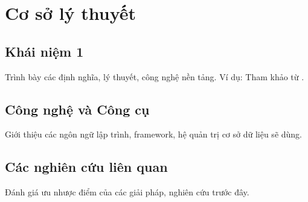 
\chapter{Cơ sở lý thuyết}

\section{Khái niệm 1}
Trình bày các định nghĩa, lý thuyết, công nghệ nền tảng.
Ví dụ: Tham khảo từ \parencite{example_article_2023}.

\section{Công nghệ và Công cụ}
Giới thiệu các ngôn ngữ lập trình, framework, hệ quản trị cơ sở dữ liệu sẽ dùng.

\section{Các nghiên cứu liên quan}
Đánh giá ưu nhược điểm của các giải pháp, nghiên cứu trước đây.

